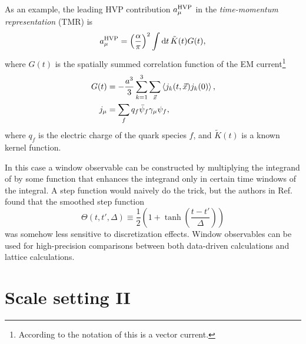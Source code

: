 As an example, the leading HVP contribution $a_\mu^{\rm HVP}$ in the
{\it time-momentum representation} (TMR) is~\cite{bernecker_vector_2011}
\begin{equation}\label{eq:amuhvp}
  a_\mu^{\rm HVP}=\left(\frac{\alpha}{\pi}\right)^2\int\dd{t}\tilde{K}(t)G(t),
\end{equation}
where $G(t)$ is the spatially summed correlation function of the EM 
current\footnote{According to the notation of 
this is a vector current.}
\begin{equation}\begin{aligned}
  G(t) &=-\frac{a^3}{3}\sum_{k=1}^3\sum_{\vec{x}}\ev{j_k(t,\vec{x})j_k(0)},\\
  j_\mu&=\sum_fq_f\bar{\psi}_f\gamma_\mu\psi_f,
\end{aligned}\end{equation}
where $q_f$ is the electric charge of the quark species $f$,
and $\tilde{K}(t)$ is a known kernel function.

In this case a window observable
can be constructed by multiplying the integrand of  by some
function that enhances the integrand only in certain time windows of the
integral. A step function would naively do the trick, but the authors
in Ref.~\cite{blum_calculation_2018} found that the smoothed step function
\begin{equation}
  \Theta(t,t',\Delta)\equiv\frac{1}{2}\left(1+\tanh\left(\frac{t-t'}{\Delta}\right)\right)
\end{equation}
was somehow less sensitive to discretization effects.
Window observables can be used for high-precision comparisons between both
data-driven calculations and lattice calculations.

\section{Scale setting II}\label{sec:refscalesII}



